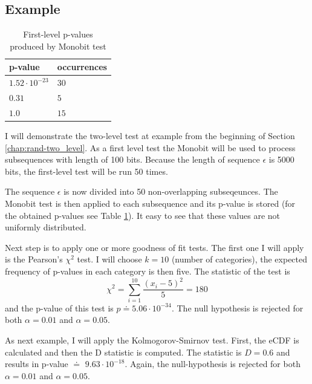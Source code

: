 \documentclass[
  digital,     %
  oneside,     %
  nosansbold,  %
  nocolorbold, %
  nolof,         %
  nolot,         %
]{fithesis4}
\begin{document}
\subsection{Example}
\begin{table}
  \begin{tabularx}{0.4\textwidth}{ll}
    \toprule
    p-value & occurrences  \\
    \midrule
    $1.52 \cdot 10^{-23}$ & $30$\\
    $0.31$ & $5$\\
    $1.0$ & $15$\\
    \bottomrule
  \end{tabularx}
  \caption{First-level p-values produced by Monobit test}
  \label{tab:first_pvalues}
\end{table}



I will demonstrate the two-level test at example from the beginning of Section \ref{chap:rand-two_level}. As a first level test the Monobit \cite[p. 2-2]{nist_special} will be used to process subsequences with length of 100 bits. Because the length of sequence $\epsilon$ is 5000 bits, the first-level test will be run 50 times.

The sequence $\epsilon$ is now divided into 50 non-overlapping subseqeunces. The Monobit test is then applied to each subsequence  and its p-value is stored (for the obtained p-values see Table \ref{tab:first_pvalues}). It easy to see that these values are not uniformly distributed.

Next step is to apply one or more goodness of fit tests. The first one I will apply is the Pearson's $\chi^2$ test. I will choose $k=10$ (number of categories), the expected frequency of p-values in each category is then five. The statistic of the test is
\[\chi^2 = \sum_{i=1}^{10} \dfrac{(x_i - 5)^2}{5} = 180 \]
and the p-value of this test is $p\doteq5.06\cdot10^{-34}$. The null hypothesis is rejected for both $\alpha = 0.01$ and $\alpha = 0.05$. 

As next example, I will apply the Kolmogorov-Smirnov test. First, the eCDF is calculated and then the D statistic is computed. The statistic is $D = 0.6$ and results in p-value $\doteq$ $9.63\cdot10^{-18}$. Again, the null-hypothesis is rejected for both $\alpha = 0.01$ and $\alpha = 0.05$. 
\end{document}
